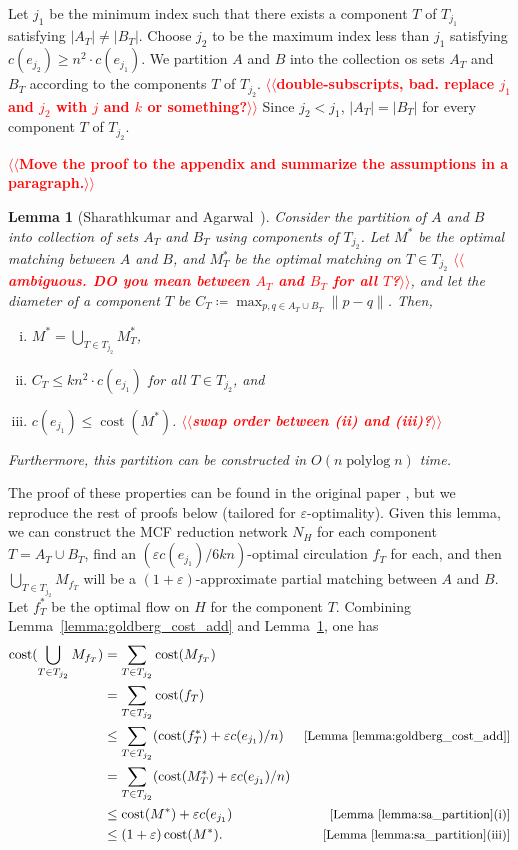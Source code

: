 \documentclass[11pt]{article}
\makeatletter
\def\polylog{\mathop{\mathrm{polylog}}}
\def\eps{\varepsilon}
\theoremstyle{plain}
\newtheorem{lemma}{Lemma}[section]
\numberwithin{figure}{section}
\def\cost{\operatorname{cost}}
\def\n@te#1{\textsf{\boldmath \textbf{$\langle\!\langle$#1$\rangle\!\rangle$}}\leavevmode}
\def\note#1{\textcolor{red}{\n@te{#1}}}
\makeatother
\begin{document}
Let $j_1$ be the minimum index such that there exists a component $T$ of $T_{j_1}$
satisfying $|A_T| \neq |B_T|$.
Choose $j_2$ to be the maximum index less than $j_1$ satisfying
$c(e_{j_2}) \geq n^2 \cdot c(e_{j_1})$.
We partition $A$ and $B$ into the collection os sets $A_T$ and $B_T$ according to the components $T$ of $T_{j_2}$. \note{double-subscripts, bad.  replace $j_1$ and $j_2$ with $j$ and $k$ or something?}
Since $j_2 < j_1$, $|A_T| = |B_T|$ for every component $T$ of $T_{j_2}$.

\note{Move the proof to the appendix and summarize the assumptions in a paragraph.}

\begin{lemma}[Sharathkumar and Agarwal~{\cite[\S3.5]{SA12}}]
\label{lemma:sa_partition}
Consider the partition of $A$ and $B$ into collection of sets $A_T$ and $B_T$ using components of $T_{j_2}$.
Let $M^*$ be the optimal matching between $A$ and $B$, and $M^*_T$ be the optimal matching
on $T \in T_{j_2}$ \note{ambiguous.  DO you mean between $A_T$ and $B_T$ for all $T$?}, and let the diameter of a component $T$ be
$C_T \coloneqq \max_{p, q \in A_T \cup B_T} \|p - q\|$.
Then,
\begin{enumerate}[(i)]
\item $M^* = \bigcup_{T \in T_{j_2}} M^*_T$,
\item $C_T \leq kn^2 \cdot c(e_{j_1})$ for all $T \in T_{j_2}$, and
\item $c(e_{j_1}) \leq \cost(M^*)$. \note{swap order between (ii) and (iii)?}
\end{enumerate}
Furthermore, this partition can be constructed in $O(n\polylog n)$ time.
\end{lemma}

The proof of these properties can be found in the original paper
\cite[Section 3.5]{SA12}, but we reproduce the rest of proofs below
(tailored for $\eps$-optimality).
Given this lemma, we can construct the MCF reduction network $N_H$ for each
component $T = A_T \cup B_T$, find an $(\eps c(e_{j_1})/6kn)$-optimal
circulation $f_T$ for each, and then $\bigcup_{T \in T_{j_2}}M_{f_T}$ will be a
$(1+\eps)$-approximate partial matching between $A$ and $B$.
Let $f^*_T$ be the optimal flow on $H$ for the component $T$.
Combining Lemma~\ref{lemma:goldberg_cost_add} and
Lemma~\ref{lemma:sa_partition}, one has
\begin{align*}
	\cost(\bigcup_{T \in T_{j_2}} M_{f_T})
		&= \sum_{T \in T_{j_2}} \cost(M_{f_T}) & \\
		&= \sum_{T \in T_{j_2}} \cost(f_T) & \\
		&\leq \sum_{T \in T_{j_2}} (\cost(f^*_T) + \eps c(e_{j_1})/n) & \text{\small [Lemma~\ref{lemma:goldberg_cost_add}]} \\
		&= \sum_{T \in T_{j_2}} (\cost(M^*_T) + \eps c(e_{j_1})/n) & \\
		&\leq \cost(M^*) + \eps c(e_{j_1}) & \text{\small [Lemma~\ref{lemma:sa_partition}(i)]} \\
		&\leq (1 + \eps) \cost(M^*). & \text{\small[Lemma~\ref{lemma:sa_partition}(iii)]}
\end{align*}
\end{document}
